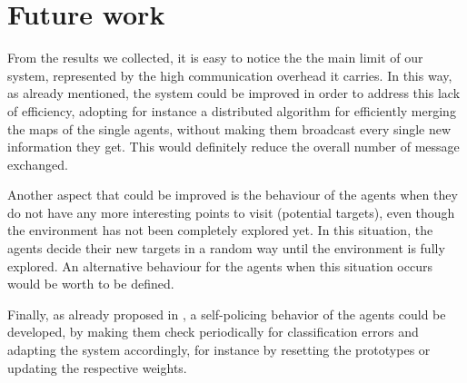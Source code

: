\documentclass[a4paper, 10pt, conference]{ieeeconf}      %
\begin{document}

\section{Future work}
From the results we collected, it is easy to notice the the   main limit of our system, represented by the high communication overhead it carries. In this way, as already mentioned, the system could be improved in order to address this lack of efficiency, adopting for instance a distributed algorithm for efficiently merging the maps of the single agents, without making them broadcast every single new information they get. This would definitely reduce the overall number of message exchanged. 

Another aspect that could be improved is the behaviour of the agents when they do not have any more interesting points to visit (potential targets), even though the environment has not been completely explored yet. In this situation, the agents decide their new targets in a random way until the environment is fully explored. An alternative behaviour for the agents when this situation occurs would be worth to be defined. 

Finally, as already proposed in \cite{tavaresgaspar}, a self-policing behavior of the agents could be developed, by making them check periodically for classification errors and adapting the system accordingly, for instance by resetting the prototypes or updating the respective weights. 


\addtolength{\textheight}{-12cm}   %
\end{document}
